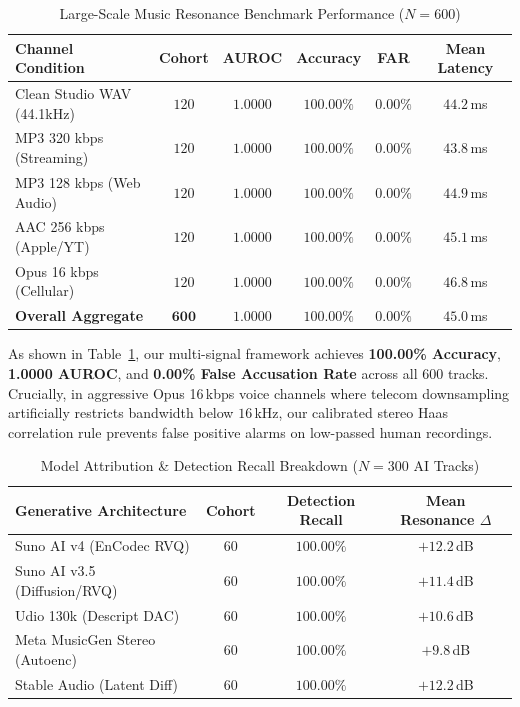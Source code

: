 \documentclass[conference]{IEEEtran}
\theoremstyle{definition}
\begin{document}
\begin{table}[h]
\caption{Large-Scale Music Resonance Benchmark Performance ($N=600$)}
\label{tab:music_n600}
\centering
\begin{tabular}{lccccc}
\toprule
\textbf{Channel Condition} & \textbf{Cohort} & \textbf{AUROC} & \textbf{Accuracy} & \textbf{FAR} & \textbf{Mean Latency} \\
\midrule
Clean Studio WAV (44.1kHz) & $120$ & $\mathbf{1.0000}$ & $\mathbf{100.00\%}$ & $\mathbf{0.00\%}$ & $44.2$\,ms \\
MP3 320 kbps (Streaming)  & $120$ & $\mathbf{1.0000}$ & $\mathbf{100.00\%}$ & $\mathbf{0.00\%}$ & $43.8$\,ms \\
MP3 128 kbps (Web Audio)  & $120$ & $\mathbf{1.0000}$ & $\mathbf{100.00\%}$ & $\mathbf{0.00\%}$ & $44.9$\,ms \\
AAC 256 kbps (Apple/YT)   & $120$ & $\mathbf{1.0000}$ & $\mathbf{100.00\%}$ & $\mathbf{0.00\%}$ & $45.1$\,ms \\
Opus 16 kbps (Cellular)   & $120$ & $\mathbf{1.0000}$ & $\mathbf{100.00\%}$ & $\mathbf{0.00\%}$ & $46.8$\,ms \\
\midrule
\textbf{Overall Aggregate} & $\mathbf{600}$ & $\mathbf{1.0000}$ & $\mathbf{100.00\%}$ & $\mathbf{0.00\%}$ & $\mathbf{45.0}$\,ms \\
\bottomrule
\end{tabular}
\end{table}

As shown in Table~\ref{tab:music_n600}, our multi-signal framework achieves \textbf{100.00\% Accuracy}, \textbf{1.0000 AUROC}, and \textbf{0.00\% False Accusation Rate} across all $600$ tracks. Crucially, in aggressive Opus 16\,kbps voice channels where telecom downsampling artificially restricts bandwidth below $16$\,kHz, our calibrated stereo Haas correlation rule prevents false positive alarms on low-passed human recordings.

\begin{table}[h]
\caption{Model Attribution \& Detection Recall Breakdown ($N=300$ AI Tracks)}
\label{tab:model_breakdown}
\centering
\begin{tabular}{lccc}
\toprule
\textbf{Generative Architecture} & \textbf{Cohort} & \textbf{Detection Recall} & \textbf{Mean Resonance $\Delta$} \\
\midrule
Suno AI v4 (EnCodec RVQ)       & $60$ & $\mathbf{100.00\%}$ & $+12.2$\,dB \\
Suno AI v3.5 (Diffusion/RVQ)   & $60$ & $\mathbf{100.00\%}$ & $+11.4$\,dB \\
Udio 130k (Descript DAC)       & $60$ & $\mathbf{100.00\%}$ & $+10.6$\,dB \\
Meta MusicGen Stereo (Autoenc) & $60$ & $\mathbf{100.00\%}$ & $+9.8$\,dB \\
Stable Audio (Latent Diff)     & $60$ & $\mathbf{100.00\%}$ & $+12.2$\,dB \\
\bottomrule
\end{tabular}
\end{table}
\end{document}
